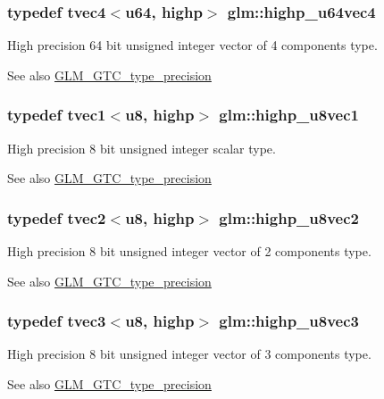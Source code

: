\subsubsection[{highp\+\_\+u64vec4}]{\setlength{\rightskip}{0pt plus 5cm}typedef tvec4$<${\bf u64}, highp$>$ {\bf glm\+::highp\+\_\+u64vec4}}\label{namespaceglm_ae7af7cc2241c15afac54724f0b8855f2}
High precision 64 bit unsigned integer vector of 4 components type. \begin{DoxySeeAlso}{See also}
\hyperlink{group__gtc__type__precision}{G\+L\+M\+\_\+\+G\+T\+C\+\_\+type\+\_\+precision} 
\end{DoxySeeAlso}
\hypertarget{namespaceglm_aec8648cdcf1bacd47205d172240be623}{}
\subsubsection[{highp\+\_\+u8vec1}]{\setlength{\rightskip}{0pt plus 5cm}typedef tvec1$<${\bf u8}, highp$>$ {\bf glm\+::highp\+\_\+u8vec1}}\label{namespaceglm_aec8648cdcf1bacd47205d172240be623}
High precision 8 bit unsigned integer scalar type. \begin{DoxySeeAlso}{See also}
\hyperlink{group__gtc__type__precision}{G\+L\+M\+\_\+\+G\+T\+C\+\_\+type\+\_\+precision} 
\end{DoxySeeAlso}
\hypertarget{namespaceglm_a38a7141fa9ddd5fb59abd032d870525a}{}
\subsubsection[{highp\+\_\+u8vec2}]{\setlength{\rightskip}{0pt plus 5cm}typedef tvec2$<${\bf u8}, highp$>$ {\bf glm\+::highp\+\_\+u8vec2}}\label{namespaceglm_a38a7141fa9ddd5fb59abd032d870525a}
High precision 8 bit unsigned integer vector of 2 components type. \begin{DoxySeeAlso}{See also}
\hyperlink{group__gtc__type__precision}{G\+L\+M\+\_\+\+G\+T\+C\+\_\+type\+\_\+precision} 
\end{DoxySeeAlso}
\hypertarget{namespaceglm_a08514b578ab54cef81fac88773e27e17}{}
\subsubsection[{highp\+\_\+u8vec3}]{\setlength{\rightskip}{0pt plus 5cm}typedef tvec3$<${\bf u8}, highp$>$ {\bf glm\+::highp\+\_\+u8vec3}}\label{namespaceglm_a08514b578ab54cef81fac88773e27e17}
High precision 8 bit unsigned integer vector of 3 components type. \begin{DoxySeeAlso}{See also}
\hyperlink{group__gtc__type__precision}{G\+L\+M\+\_\+\+G\+T\+C\+\_\+type\+\_\+precision} 
\end{DoxySeeAlso}
\hypertarget{namespaceglm_adfad96397d5689c0c925dacf0f302da0}{}
